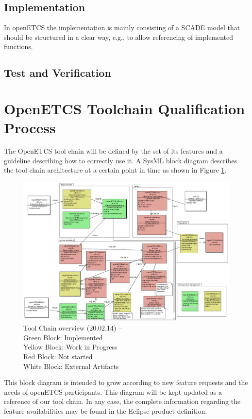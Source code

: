 \subsection{Implementation}
In openETCS the implementation is mainly consisting of a SCADE model that should be structured in a clear way, e.g., to allow referencing of implemented functions.

\subsection{Test and Verification}


\section{OpenETCS Toolchain Qualification Process}
\label{sec:toolchain-qualification-process}

The OpenETCS tool chain  will be defined by the set of its features and
a guideline describing how to correctly use it.
A SysML block diagram describes the tool chain architecture at a certain point in time as shown in
Figure \ref{fig:overview}. 
\begin{figure}[htbp]
\includegraphics[width=\textwidth]{ToolChainmodel}
\caption{\label{fig:overview} Tool Chain overview (20.02.14) -- \\
  Green Block: Implemented \\
  Yellow Block: Work in Progress \\
  Red Block: Not started \\
  White Block: External Artifacts} 
\end{figure}

This block diagram is intended to grow according to new feature requests and the
needs of openETCS participants.  This diagram will be kept updated
as a reference of our tool chain. In any case, the complete information
regarding the feature availabilities  may be found in the Eclipse product
definition.

